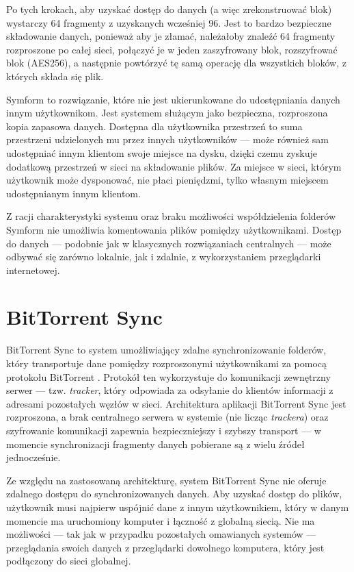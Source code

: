 Po tych krokach, aby uzyskać dostęp do danych (a więc zrekonstruować blok) wystarczy 64 fragmenty z uzyskanych wcześniej 96. Jest to bardzo bezpieczne składowanie danych, ponieważ aby je złamać, należałoby znaleźć 64 fragmenty rozproszone po całej sieci, połączyć je w jeden zaszyfrowany blok, rozszyfrować blok (AES256), a następnie powtórzyć tę samą operację dla wszystkich bloków, z których składa się plik.

Symform to rozwiązanie, które nie jest ukierunkowane do udostępniania danych innym użytkownikom. Jest systemem służącym jako bezpieczna, rozproszona kopia zapasowa danych. Dostępna dla użytkownika przestrzeń to suma przestrzeni udzielonych mu przez innych użytkowników --- może również sam udostępniać innym klientom swoje miejsce na dysku, dzięki czemu zyskuje dodatkową przestrzeń w sieci na składowanie plików. Za miejsce w sieci, którym użytkownik może dysponować, nie płaci pieniędzmi, tylko własnym miejscem udostępnianym innym klientom.

Z racji charakterystyki systemu oraz braku możliwości współdzielenia folderów Symform nie umożliwia komentowania plików pomiędzy użytkownikami. Dostęp do danych --- podobnie jak w klasycznych rozwiązaniach centralnych --- może odbywać się zarówno lokalnie, jak i zdalnie, z wykorzystaniem przeglądarki internetowej.

\section*{BitTorrent Sync}

BitTorrent Sync \cite{btsync} to system umożliwiający zdalne synchronizowanie folderów, który transportuje dane pomiędzy rozproszonymi użytkownikami za pomocą protokołu BitTorrent \cite{bittorrentlib}. Protokół ten wykorzystuje do komunikacji zewnętrzny serwer --- tzw. \emph{tracker}, który odpowiada za odsyłanie do klientów informacji z adresami pozostałych węzłów w sieci. Architektura aplikacji BitTorrent Sync jest rozproszona, a brak centralnego serwera w systemie (nie licząc \emph{trackera}) oraz szyfrowanie komunikacji zapewnia bezpieczniejszy i szybszy transport --- w momencie synchronizacji fragmenty danych pobierane są z wielu źródeł jednocześnie.

Ze względu na zastosowaną architekturę, system BitTorrent Sync nie oferuje zdalnego dostępu do synchronizowanych danych. Aby uzyskać dostęp do plików, użytkownik musi najpierw uspójnić dane z innym użytkownikiem, który w danym momencie ma uruchomiony komputer i łączność z globalną siecią. Nie ma możliwości --- tak jak w przypadku pozostałych omawianych systemów --- przeglądania swoich danych z przeglądarki dowolnego komputera, który jest podłączony do sieci globalnej.

